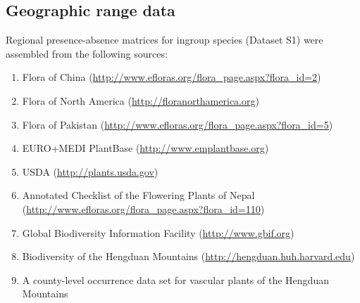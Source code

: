 \subsection*{Geographic range data}

Regional presence-absence matrices for ingroup species (Dataset S1)
were assembled from the following sources:

\begin{enumerate}
\item Flora of China
  (\href{http://www.efloras.org/flora_page.aspx?flora_id=2}{http://www.efloras.org/flora\_page.aspx?flora\_id=2})
\item Flora of North
  America (\href{http://floranorthamerica.org}{http://floranorthamerica.org})
\item Flora of Pakistan
  (\href{http://www.efloras.org/flora\_page.aspx?flora\_id=5}{http://www.efloras.org/flora\_page.aspx?flora\_id=5})
\item EURO+MEDI PlantBase
  (\href{http://www.emplantbase.org}{http://www.emplantbase.org})
\item USDA (\href{http://plants.usda.gov}{http://plants.usda.gov})
\item Annotated Checklist of the Flowering Plants of Nepal
  (\href{http://www.efloras.org/flora\_page.aspx?flora\_id=110}{http://www.efloras.org/flora\_page.aspx?flora\_id=110})
\item Global Biodiversity Information Facility
  (\href{http://www.gbif.org}{http://www.gbif.org})
\item Biodiversity of the Hengduan Mountains
  (\href{http://hengduan.huh.harvard.edu}{http://hengduan.huh.harvard.edu})
\item A county-level occurrence data set for vascular plants of the
  Hengduan Mountains \citep{Zhang2009,Wu2008}
\end{enumerate}

\clearpage
\newpage

\clearpage
\newpage


